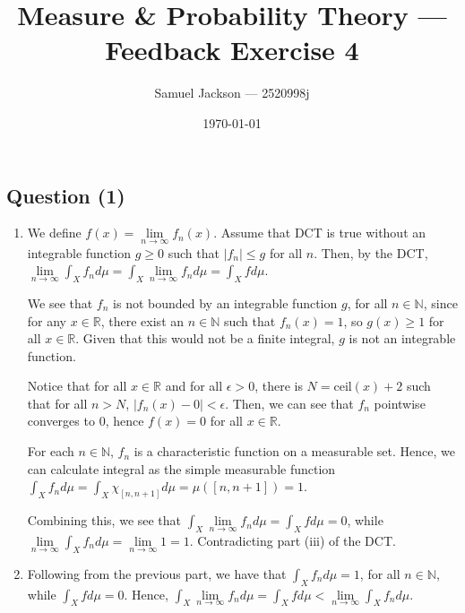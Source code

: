 \documentclass{article}
\title{Measure \& Probability Theory  --- Feedback Exercise 4}
\author{Samuel Jackson --- 2520998j}
\date{\today}
\begin{document}
\maketitle

\newcommand{\N}{\mathbb{N}}
\newcommand{\R}{\mathbb{R}}
\newcommand{\Z}{\mathbb{Z}}
\newcommand{\Q}{\mathbb{Q}}
\newcommand{\I}{\mathbb{I}}

\newcommand{\A}{\mathcal{A}}
\newcommand{\C}{\mathcal{C}}

\newcommand{\borel}{\mathcal{B}(\mathbb{R})}
\newcommand{\powerX}{\mathcal{P}(X)}

\newcommand{\salgebra}{\sigma\text{-algebra}}
\newcommand{\outerset}{\mathcal{M}_{\outermu}}
\newcommand{\outermu}{\mu^\ast}
\newcommand{\outerlamb}{\lambda^\ast}

\newcommand{\invf}{f^{-1}}
\newcommand{\invh}{h^{-1}}
\newcommand{\invg}{g^{-1}}

\newcommand{\nlim}{\lim\limits_{n \rightarrow \infty}}

\begin{center}
\section*{Question (1)}
\end{center}

\begin{enumerate}[label=(\roman*)]
    \item We define $f(x) = \nlim f_n(x)$. Assume that DCT is true without an integrable function $g \geq 0$ such that $|f_n| \leq g$ for all $n$. Then, by the DCT, $\nlim \int_X f_n d\mu= \int_X \nlim f_n d\mu = \int_X f d\mu$. \newline
    
    We see that $f_n$ is not bounded by an integrable function $g$, for all $n \in \N$, since for any $x \in \R$, there exist an $n \in \N$ such that $f_n(x) = 1$, so $g(x) \geq 1$ for all $x \in \R$. Given that this would not be a finite integral, $g$ is not an integrable function. 
    
    Notice that for all $x \in \R$ and for all $\epsilon > 0$, there is $N = \text{ceil}(x) + 2$ such that for all $n > N$, $|f_n(x) - 0| < \epsilon$. Then, we can see that $f_n$ pointwise converges to $0$, hence $f(x) = 0$ for all $x \in \R$. \newline
    
    For each $n \in \N$, $f_n$ is a characteristic function on a measurable set. Hence, we can calculate integral as the simple measurable function $\int_X f_n d\mu = \int_X  \chi_{[n, n+1]} d\mu = \mu([n, n+1]) = 1$. \newline
    
    Combining this, we see that $\int_X \nlim f_n d\mu = \int_X f d\mu = 0$, while $\nlim \int_X f_n d\mu = \nlim 1 = 1$. Contradicting part (iii) of the DCT.
    
    \item Following from the previous part, we have that $\int_X f_n d\mu = 1$, for all $n \in \N$, while $\int_X f d\mu = 0$. Hence, $\int_X \nlim f_n d\mu = \int_X f d\mu < \nlim \int_X f_n d\mu$. 	 
\end{enumerate}
    
\end{document}
